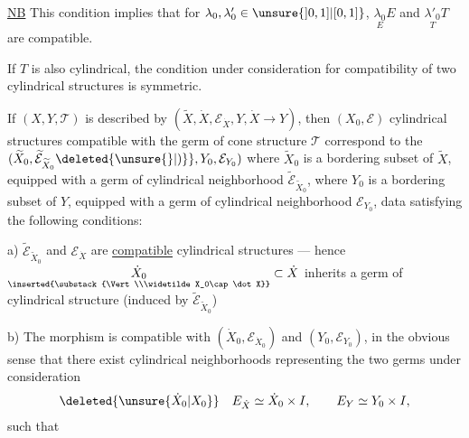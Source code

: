 \uline{NB} This condition implies that for $\lambda_0,\lambda'_0\in\unsure{]0,1]|[0,1]}$,
$\underset{E}{\lambda_0}E$ and $\underset{T}{\lambda'_0}T$ are compatible.

If $T$ is also cylindrical, the condition
under consideration for compatibility of two cylindrical
structures is symmetric.

If $(X,Y,\mathcal T)$ is described by $(\widetilde X,\dot X,\mathcal E_{\dot X},Y,\dot X\to Y)$,
then  $(X_0,\mathcal E)$  cylindrical structures compatible
with the germ of cone structure $\mathcal T$ correspond
to the 
$(\widetilde X_0,\widetilde{\mathcal E}_{\widetilde X_0}\deleted{\unsure{\}|)}},Y_0,\mathcal E_{Y_0})$
where $\widetilde X_0$ is a bordering subset of  $\widetilde X$, equipped
with a germ of cylindrical neighborhood $\widetilde{\mathcal E}_{\widetilde X_0}$,
where $Y_0$ is a bordering subset of $Y$, equipped with
a germ of  cylindrical neighborhood
$\mathcal E_{Y_0}$,  data satisfying the following
conditions:

a) $\widetilde{\mathcal E}_{\widetilde X_0}$ and $\mathcal E_{\dot X}$ are
 \uline{compatible} cylindrical structures
--- hence $\underset{\inserted{\substack{\Vert\\\widetilde X_0\cap\dot X}}}{\dot X_0}\subset\dot X$
inherits a
germ of cylindrical structure  (induced by
$\widetilde{\mathcal E}_{\widetilde X_0}$)

b) The morphism
is compatible
with $(\dot X_0,\mathcal E_{\dot X_0})$ and $(Y_0,\mathcal E_{Y_0})$, in the obvious
sense 
that there exist cylindrical neighborhoods
representing the two germs under consideration
\[
\deleted{\unsure{\dot X_0|X_0}}\quad
E_{\dot X}\simeq\dot X_0\times I,\qquad E_Y\simeq Y_0\times I,
\]
such that
